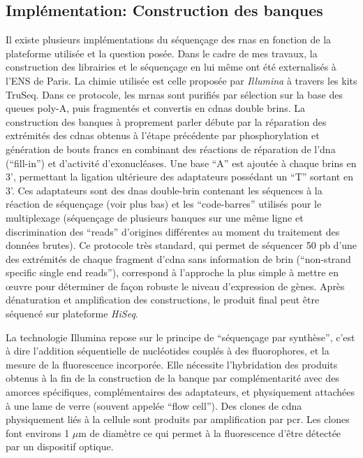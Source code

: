 \documentclass[../main.tex]{subfiles}
\begin{document}
	\subsection{Implémentation: Construction des banques}
		Il existe plusieurs implémentations du séquençage des \glspl{rna} en fonction de la plateforme utilisée et la question posée.
		Dans le cadre de mes travaux, la construction des librairies et le séquençage en lui même ont été externalisés à l'ENS de Paris.
		La chimie utilisée est celle proposée par \textit{Illumina} à travers les kits TruSeq.
		Dans ce protocole, les \glspl{mrna} sont purifiés par sélection sur la base des queues poly-A, puis fragmentés et convertis en \glspl{cdna} double brins.
		La construction des banques à proprement parler débute par la réparation des extrémités des \glspl{cdna} obtenus à l'étape précédente par phosphorylation et génération de bouts francs en combinant des réactions de réparation de l'\gls{dna} (``fill-in'') et d'activité d'exonucléases.
		Une base ``A'' est ajoutée à chaque brins en 3', permettant la ligation ultérieure des adaptateurs possédant un ``T'' sortant en 3'.
		Ces adaptateurs sont des \glspl{dna} double-brin contenant les séquences à la réaction de séquençage (voir plus bas) et les ``code-barres'' utilisés pour le multiplexage (séquençage de plusieurs banques sur une même ligne et discrimination des ``reads'' d'origines différentes au moment du traitement des données brutes).
		Ce protocole très standard, qui permet de séquencer 50 \gls{pb} d'une des extrémités de chaque fragment d'\gls{cdna} sans information de brin (``non-strand specific single end reads''), correspond à l'approche la plus simple à mettre en œuvre pour déterminer de façon robuste le niveau d'expression de gènes.
		Après dénaturation et amplification des constructions, le produit final peut être séquencé sur plateforme \textit{HiSeq}.
		\par
		La technologie Illumina repose sur le principe de ``séquençage par synthèse'', c'est à dire l'addition séquentielle de nucléotides couplés à des fluorophores, et la mesure de la fluorescence incorporée.
		Elle nécessite l'hybridation des produits obtenus à la fin de la construction de la banque par complémentarité avec des amorces spécifiques, complémentaires des adaptateurs, et physiquement attachées à une lame de verre (souvent appelée ``flow cell'').
		Des clones de \gls{cdna} physiquement liés à la cellule sont produits par amplification par \gls{pcr}.
		Les clones font environs 1 $\mu$m de diamètre ce qui permet à la fluorescence d'être détectée par un dispositif optique.
\end{document}
